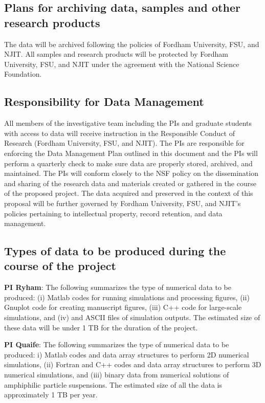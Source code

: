 \documentclass[11pt]{article}
\begin{document}
\subsection*{Plans for archiving data, samples and other research
products}
The data will be archived following the policies of Fordham University,
FSU, and NJIT. All samples and research products will be protected by
Fordham University, FSU, and NJIT under the agreement with the National
Science Foundation.

\subsection*{Responsibility for Data Management}
All members of the investigative team including the PIs and graduate
students with access to data will receive instruction in the Responsible
Conduct of Research (Fordham University, FSU, and NJIT). The PIs are
responsible for enforcing the Data Management Plan outlined in this
document and the PIs will perform a quarterly check to make sure data
are properly stored, archived, and maintained. The PIs will conform
closely to the NSF policy on the dissemination and sharing of the
research data and materials created or gathered in the course of the
proposed project. The data acquired and preserved in the context of
this proposal will be further governed by Fordham University, FSU, and
NJIT's policies pertaining to intellectual property, record retention,
and data
management.

\subsection*{Types of data to be produced during the course of the
project}
{\bf PI Ryham}:
The following summarizes the type of numerical data to
be produced:
(i) Matlab codes for running simulations and
processing figures,
(ii) Gnuplot code for creating manuscript figures, 
(iii) C++ code for large-scale simulations, and 
(iv) and ASCII files of simulation outputs. The estimated size of these
data will be under 1 TB for the duration of the project.  

\noindent
{\bf PI Quaife}: The following summarizes the type of numerical data to
be produced: i) Matlab codes and data array structures to perform 2D
numerical simulations, (ii) Fortran and C++ codes and data array
structures to perform 3D numerical simulations, and (iii) binary data
from numerical solutions of amphiphilic particle suspensions. The
estimated size of all the data is approximately 1 TB per year. 
\end{document}
